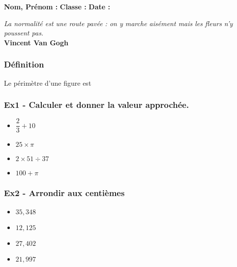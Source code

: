 



\textbf{Nom, Prénom :} \hspace{8cm} \textbf{Classe :} \hspace{3cm} \textbf{Date :}\\

\begin{center}
  \textit{La normalité est une route pavée : on y marche aisément mais les fleurs n’y poussent pas.} \\ 
  \textbf{Vincent Van Gogh}
\end{center}

\subsubsection*{Définition} 

Le périmètre d'une figure est \dotfill \\ \Pointilles[1]

\subsubsection*{Ex1 - Calculer et donner la valeur approchée.} 

\begin{multicols}{2}\noindent
\begin{itemize}[label={$\bullet$}]
  \item $\dfrac{2}{3} + 10$ \dotfill \\
  \item $25 \times \pi$ \dotfill \\
  \item $2 \times 51 \div 37$ \dotfill \\
  \item $100 + \pi$ \dotfill \\
\end{itemize} \end{multicols}

\subsubsection*{Ex2 - Arrondir aux centièmes} 

\begin{multicols}{2}\noindent
\begin{itemize}[label={$\bullet$}]
  \item $35,348$ \dotfill \\
  \item $12,125$ \dotfill \\
  \item $27,402$ \dotfill \\
  \item $21,997$ \dotfill \\
\end{itemize} \end{multicols}

